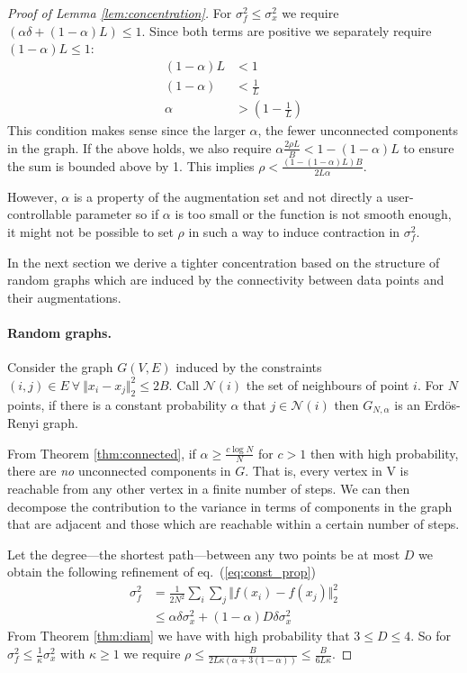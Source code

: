 \documentclass{article}
\def\eqref#1{eq.~(\ref{#1})}
\newcommand{\feat}{f}
\newcommand{\nrm}[1]{\Vert {#1} \Vert_2^2}
\begin{document}
\begin{proof}[Proof of Lemma \ref{lem:concentration}]
For $\sigma^2_{\feat} \leq \sigma^2_x$ we require $ (\alpha \delta + (1-\alpha)L)\leq 1$. Since both terms are positive we separately require $(1-\alpha)L \leq 1$:
\begin{align*}
    (1-\alpha)L & < 1
    \\
    (1-\alpha) & < \frac{1}{L}
    \\
    \alpha & > (1-\frac{1}{L})
\end{align*}
This condition makes sense since the larger $\alpha$, the fewer unconnected components in the graph.
If the above holds, we also require $\alpha\frac{2\rho L}{B} < 1 - (1-\alpha) L$ to ensure the sum is bounded above by 1. This implies $\rho <\frac{(1- (1-\alpha)L)B}{2 L \alpha}$.

However, $\alpha$ is a property of the augmentation set and not directly a user-controllable parameter so if $\alpha$ is too small or the function is not smooth enough, it might not be possible to set $\rho$ in such a way to induce contraction in $\sigma^2_{\feat}$. 

In the next section we derive a tighter concentration based on the structure of random graphs which are induced by the connectivity between data points and their augmentations.

\paragraph{Random graphs.}
 Consider the graph $G(V,E)$ induced by the constraints $(i,j) \in E ~ \forall ~ \nrm{x_i - x_j}\leq 2B$. Call $\mathcal{N}(i)$ the set of neighbours of point $i$. For $N$ points, if there is a constant probability $\alpha$ that $j\in\mathcal{N}(i)$ then $G_{N,\alpha}$ is an Erd\"{o}s-Renyi graph. 
 
 From Theorem \ref{thm:connected}, if $\alpha \geq \frac{c \log N}{N}$ for $c>1$ then with high probability, there are \emph{no} unconnected components in $G$. That is, every vertex in V is reachable from any other vertex in a finite number of steps. We can then decompose the contribution to the variance in terms of components in the graph that are adjacent and those which are reachable within a certain number of steps.

Let the degree---the shortest path---between any two points be at most $D$ we obtain the following refinement of \eqref{eq:const_prop}
\begin{align*}
    \sigma^2_{\feat} & = \frac{1}{2N^2} \sum_{i}\sum_{j} \nrm{\feat(x_i) - \feat(x_j)} 
    \\
    & \leq  \alpha \delta \sigma^2_x + (1-\alpha) D \delta \sigma^2_x
\end{align*}
From Theorem \ref{thm:diam} we have with high probability that $3\leq D \leq 4$. So for $\sigma^2_{\feat} \leq \frac{1}{\kappa} \sigma^2_x$ with $\kappa\geq 1$ we require $\rho \leq \frac{B}{2L\kappa(\alpha + 3(1-\alpha) )}\leq \frac{B}{6L\kappa}$.
\end{proof}
\end{document}
